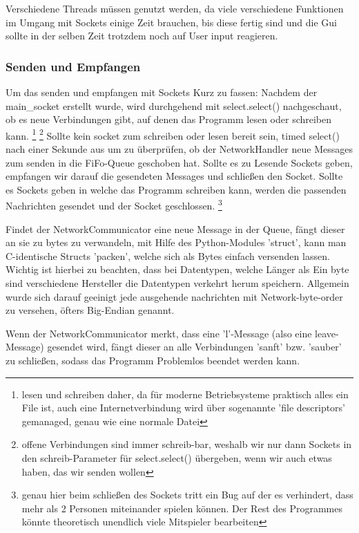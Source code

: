 \documentclass[a4paper]{article}
\begin{document}
                Verschiedene Threads müssen genutzt werden, da viele verschiedene Funktionen im Umgang mit Sockets einige Zeit brauchen, bis diese fertig sind und die Gui sollte in der selben Zeit trotzdem noch auf User input reagieren.
            
            \subsubsection{Senden und Empfangen}
                Um das senden und empfangen mit Sockets Kurz zu fassen: Nachdem der main\_socket erstellt wurde, wird durchgehend mit select.select() nachgeschaut, ob es neue Verbindungen gibt, auf denen das Programm lesen oder schreiben kann. \footnote{lesen und schreiben daher, da für moderne Betriebsysteme praktisch alles ein File ist, auch eine Internetverbindung wird über sogenannte 'file descriptors' gemanaged, genau wie eine normale Datei} \footnote{offene Verbindungen sind immer schreib-bar, weshalb wir nur dann Sockets in den schreib-Parameter für select.select() übergeben, wenn wir auch etwas haben, das wir senden wollen} Sollte kein socket zum schreiben oder lesen bereit sein, timed select() nach einer Sekunde aus um zu überprüfen, ob der NetworkHandler neue Messages zum senden in die FiFo-Queue geschoben hat.
                Sollte es zu Lesende Sockets geben, empfangen wir darauf die gesendeten Messages und schließen den Socket.
                Sollte es Sockets geben in welche das Programm schreiben kann, werden die passenden Nachrichten gesendet und der Socket geschlossen. \footnote{genau hier beim schließen des Sockets tritt ein Bug auf der es verhindert, dass mehr als 2 Personen miteinander spielen können. Der Rest des Programmes könnte theoretisch unendlich viele Mitspieler bearbeiten}
                
                Findet der NetworkCommunicator eine neue Message in der Queue, fängt dieser an sie zu bytes zu verwandeln, mit Hilfe des Python-Modules 'struct', kann man C-identische Structs 'packen', welche sich als Bytes einfach versenden lassen.
                Wichtig ist hierbei zu beachten, dass bei Datentypen, welche Länger als Ein byte sind verschiedene Hersteller die Datentypen verkehrt herum speichern. Allgemein wurde sich darauf geeinigt jede ausgehende nachrichten mit Network-byte-order zu versehen, öfters Big-Endian genannt.
                
                Wenn der NetworkCommunicator merkt, dass eine 'l'-Message (also eine leave-Message) gesendet wird, fängt dieser an alle Verbindungen 'sanft' bzw. 'sauber' zu schließen, sodass das Programm Problemlos beendet werden kann. 
            
\end{document}
